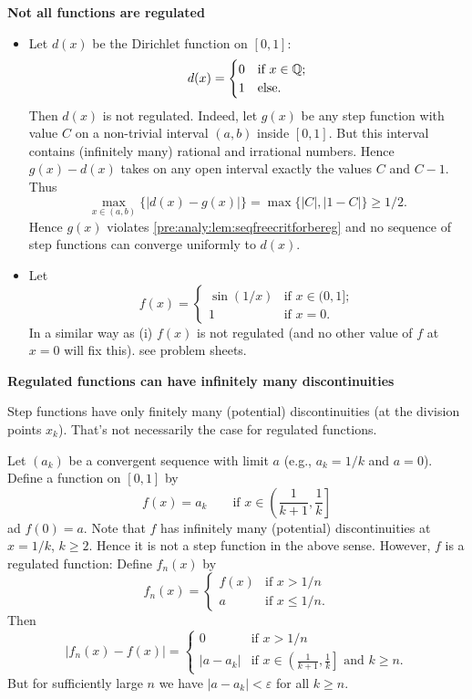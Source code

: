 \documentclass[10pt, a4paper]{article}
\begin{document}
\textbf{Not all functions are regulated}
\begin{itemize}
    \item Let $d(x)$ be the Dirichlet function on $[0, 1]$:
    \[
    d(x) = \begin{cases}
        0 & \text{if } x \in \mathbb{Q}; \\
        1 & \text{else}.
    \end{cases}
    \]
    Then $d(x)$ is not regulated.
    Indeed,
    let $g(x)$ be any step function with value $C$ on a non-trivial interval $(a, b)$ inside $[0, 1]$.
    But this interval contains
    (infinitely many)
    rational and irrational numbers.
    Hence $g(x) - d(x)$ takes on any open interval exactly the values $C$ and $C - 1$.
    Thus
    \[
    \max_{x \in (a, b)}\{|d(x) - g(x)|\} = \max\{|C|, |1 - C|\} \geq 1 / 2.
    \]
    Hence $g(x)$ violates \autoref{pre:analy:lem:seqfreecritforbereg} and no sequence of step functions can converge uniformly to $d(x)$.

    \item Let
    \[
    f(x) = \begin{cases}
        \sin(1 / x) & \text{if } x \in (0, 1]; \\
        1 & \text{if } x = 0.
    \end{cases}
    \]
    In a similar way as (i) $f(x)$ is not regulated
    (and no other value of $f$ at $x = 0$ will fix this).
    see problem sheets.
\end{itemize}

\textbf{Regulated functions can have infinitely many discontinuities}

Step functions have only finitely many
(potential)
discontinuities
(at the division points $x_k$).
That's not necessarily the case for regulated functions.

Let $(a_k)$ be a convergent sequence with limit $a$
(e.g.,
$a_k = 1 / k$ and $a = 0$).
Define a function on $[0, 1]$ by
\[
f(x) = a_k\qquad\text{if } x \in \left(\frac{1}{k + 1}, \frac{1}{k}\right]
\]
ad $f(0) = a$.
Note that $f$ has infinitely many
(potential)
discontinuities at $x = 1 / k$,
$k \geq 2$.
Hence it is not a step function in the above sense.
However,
$f$ is a regulated function:
Define $f_n(x)$ by
\[
f_n(x) = \begin{cases}
    f(x) &\text{if } x > 1 / n \\
    a &\text{if } x \leq 1 / n.
\end{cases}
\]
Then
\[
|f_n(x) - f(x)| = \begin{cases}
    0 &\text{if } x > 1 / n \\
    |a - a_k| &\text{if } x \in \left(\frac{1}{k + 1}, \frac{1}{k}\right]\text{ and } k \geq n.
\end{cases}
\]
But for sufficiently large $n$ we have $|a - a_k| < \varepsilon$ for all $k \geq n$.
\end{document}
